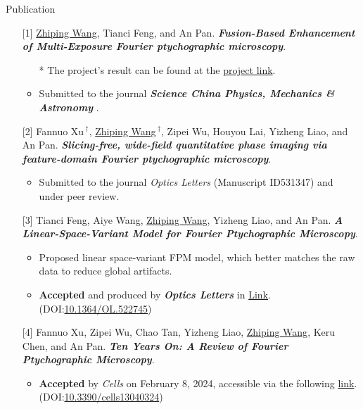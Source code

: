 \documentclass[]{kyvernitis-resume}
\begin{document}
\begin{section}{\Large Publication}
\begin{itemize}
    
    \item[{[1]}] \underline{Zhiping Wang}, Tianci Feng, and An Pan. \emph{\textbf{Fusion-Based Enhancement of Multi-Exposure Fourier ptychographic microscopy}}.
     \begin{itemize}
         \item[*] The project's result can be found at the \href{https://wang-zhiping.github.io/ResearchSummary&Reporting/FPM/fusion.html}{project link}.
    \item Submitted to the journal \emph{\textbf{Science China Physics, Mechanics \& Astronomy
    }}.
    \end{itemize}

    \item[{[2]}] Fannuo Xu$\,^{\dag}$, \underline{Zhiping Wang$\,^{\dag}$}, Zipei Wu, Houyou Lai, Yizheng Liao, and An Pan. \emph{\textbf{Slicing-free, wide-field quantitative phase imaging via feature-domain Fourier ptychographic microscopy}}.

    \begin{itemize}
   \item Submitted to the journal \emph{{Optics Letters}} (Manuscript ID531347) and under peer review.
   \end{itemize}


 \item[{[3]}] Tianci Feng, Aiye Wang, \underline{Zhiping Wang}, Yizheng Liao, and An Pan. \emph{\textbf{A Linear-Space-Variant Model for Fourier Ptychographic Microscopy}}.
    \begin{itemize}
    \item Proposed linear space-variant FPM model, which better matches the raw data to reduce global artifacts.
    \item \textbf{Accepted} and produced by \emph{\textbf{Optics Letters}} in \href{https://opg.optica.org/ol/abstract.cfm?doi=10.1364/OL.522745}{Link}. (DOI:\href{http://dx.doi.org/10.1364/OL.522745 }{10.1364/OL.522745})


    \end{itemize}

\item[{[4]}] Fannuo Xu, Zipei Wu, Chao Tan, Yizheng Liao, \underline{Zhiping Wang}, Keru Chen, and An Pan. \emph{\textbf{Ten Years On: A Review of Fourier Ptychographic Microscopy}}.
\begin{itemize}
\item \textbf{Accepted} by \emph{Cells} on February 8, 2024, accessible via the following \href{https://www.mdpi.com/2073-4409/13/4/324}{link}.(DOI:\href{hhttps://doi.org/10.3390/cells13040324}{10.3390/cells13040324})
    \end{itemize}




\end{itemize}
\end{section}
\end{document}
